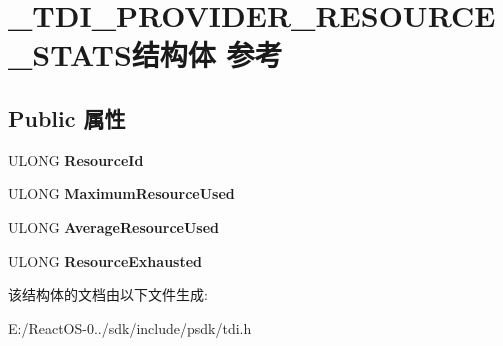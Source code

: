 \hypertarget{struct___t_d_i___p_r_o_v_i_d_e_r___r_e_s_o_u_r_c_e___s_t_a_t_s}{}\section{\+\_\+\+T\+D\+I\+\_\+\+P\+R\+O\+V\+I\+D\+E\+R\+\_\+\+R\+E\+S\+O\+U\+R\+C\+E\+\_\+\+S\+T\+A\+T\+S结构体 参考}
\label{struct___t_d_i___p_r_o_v_i_d_e_r___r_e_s_o_u_r_c_e___s_t_a_t_s}
\subsection*{Public 属性}
\begin{DoxyCompactItemize}
\item 
\mbox{\label{struct___t_d_i___p_r_o_v_i_d_e_r___r_e_s_o_u_r_c_e___s_t_a_t_s_ae8b22a7f1da50efe753e1da16e112db6}} 
U\+L\+O\+NG {\bfseries Resource\+Id}
\item 
\mbox{\label{struct___t_d_i___p_r_o_v_i_d_e_r___r_e_s_o_u_r_c_e___s_t_a_t_s_ac70b8841d7bda1fd52e71231f932911c}} 
U\+L\+O\+NG {\bfseries Maximum\+Resource\+Used}
\item 
\mbox{\label{struct___t_d_i___p_r_o_v_i_d_e_r___r_e_s_o_u_r_c_e___s_t_a_t_s_ac528b246b29ab62b15b8e7b7d444e0b2}} 
U\+L\+O\+NG {\bfseries Average\+Resource\+Used}
\item 
\mbox{\label{struct___t_d_i___p_r_o_v_i_d_e_r___r_e_s_o_u_r_c_e___s_t_a_t_s_a5059c71ba75b8b68622a11f468f3c96a}} 
U\+L\+O\+NG {\bfseries Resource\+Exhausted}
\end{DoxyCompactItemize}


该结构体的文档由以下文件生成\+:\begin{DoxyCompactItemize}
\item 
E\+:/\+React\+O\+S-\/0../sdk/include/psdk/tdi.\+h\end{DoxyCompactItemize}
